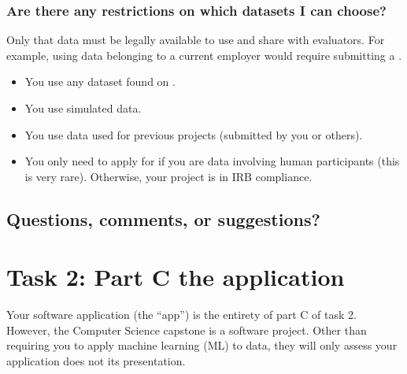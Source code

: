 \documentclass[letterpaper,10pt,english]{jupyterBook}
\begin{document}
\subsection{Are there any restrictions on which datasets I can choose?}
\label{\detokenize{task1:are-there-any-restrictions-on-which-datasets-i-can-choose}}
\sphinxAtStartPar
Only that data must be legally available to use and share with evaluators. For example, using data belonging to a current employer would require submitting a .
\begin{itemize}
\item {} 
\sphinxAtStartPar
You  use any dataset found on .

\item {} 
\sphinxAtStartPar
You  use simulated data.

\item {} 
\sphinxAtStartPar
You  use data used for previous projects (submitted by you or others).

\item {} 
\sphinxAtStartPar
You only need to apply for  if you are  data involving human participants (this is very rare). Otherwise, your project is in IRB compliance.

\end{itemize}


\section{Questions, comments, or suggestions?}
\label{\detokenize{task1:questions-comments-or-suggestions}}


\sphinxstepscope


\chapter{Task 2: Part C \sphinxhyphen{}the application}
\label{\detokenize{task2_c/task2_part_c:task-2-part-c-the-application}}\label{\detokenize{task2_c/task2_part_c::doc}}\label{\detokenize{task2_c/task2_part_c:task2-part-c}}
\sphinxAtStartPar
Your software application (the “app”) is the entirety of part C of task 2. However, the Computer Science capstone is  a software project. Other than requiring you to apply machine learning (ML) to data, they will only assess  your application does \sphinxhyphen{}not its presentation.
\end{document}
